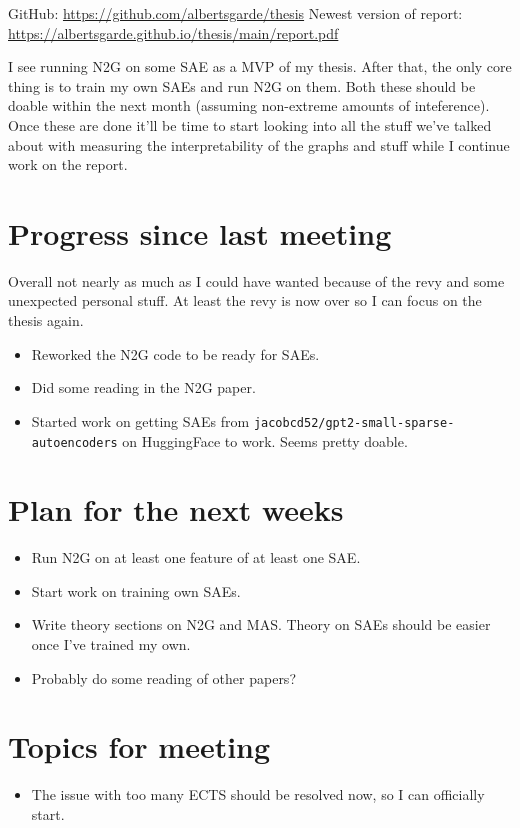 \documentclass[main.tex]{subfiles}
\begin{document}
GitHub: \url{https://github.com/albertsgarde/thesis}
Newest version of report: \url{https://albertsgarde.github.io/thesis/main/report.pdf}

I see running N2G on some SAE as a MVP of my thesis.
After that, the only core thing is to train my own SAEs and run N2G on them.
Both these should be doable within the next month (assuming non-extreme amounts of inteference).
Once these are done it'll be time to start looking into all the stuff we've talked about with measuring the interpretability of the graphs and stuff while I continue work on the report.

\section*{Progress since last meeting}
Overall not nearly as much as I could have wanted because of the revy and some unexpected personal stuff.
At least the revy is now over so I can focus on the thesis again.
\begin{itemize}
    \item Reworked the N2G code to be ready for SAEs.
    \item Did some reading in the N2G paper.
    \item Started work on getting SAEs from \texttt{jacobcd52/gpt2-small-sparse-autoencoders} on HuggingFace to work.
    Seems pretty doable.
\end{itemize}
\section*{Plan for the next weeks}
\begin{itemize}
    \item Run N2G on at least one feature of at least one SAE.
    \item Start work on training own SAEs.
    \item Write theory sections on N2G and MAS.
    Theory on SAEs should be easier once I've trained my own.
    \item Probably do some reading of other papers?
\end{itemize}
\section*{Topics for meeting}
\begin{itemize}
    \item The issue with too many ECTS should be resolved now, so I can officially start.
\end{itemize}
\end{document}
